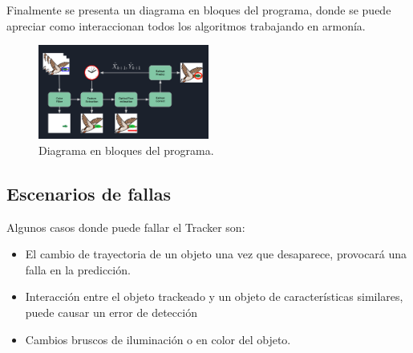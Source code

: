  Finalmente se presenta un diagrama en bloques del programa, donde se puede apreciar como interaccionan todos los algoritmos trabajando en armonía.
\begin{figure}[H]
\centering
	\includegraphics[width=0.5\textwidth]{Imagenes/diagram.png}
	\caption{Diagrama en bloques del programa.}
	\label{fig:bloques}
\end{figure}


\subsection{Escenarios de fallas}
Algunos casos donde puede fallar el Tracker son:
\begin{itemize}
\item El cambio de trayectoria de un objeto una vez que desaparece, provocará una falla en la predicción.
\item Interacción entre el objeto trackeado y un objeto de características similares, puede causar un error de detección
\item Cambios bruscos de iluminación o en color del objeto.

\end{itemize}


